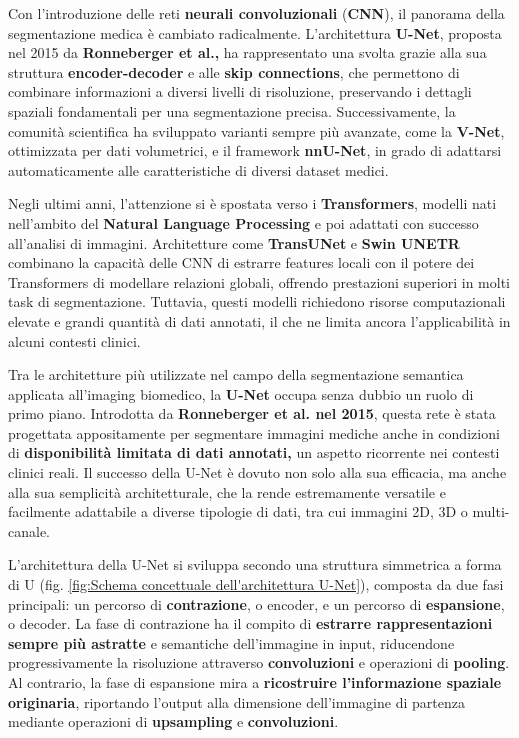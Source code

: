 Con l’introduzione delle reti \textbf{neurali convoluzionali} (\textbf{CNN}), il panorama della segmentazione medica è cambiato radicalmente. L’architettura \textbf{U-Net}, proposta nel 2015 da \textbf{Ronneberger et al.,} ha rappresentato una svolta grazie alla sua struttura \textbf{encoder-decoder} e alle \textbf{skip connections}, che permettono di combinare informazioni a diversi livelli di risoluzione, preservando i dettagli spaziali fondamentali per una segmentazione precisa. Successivamente, la comunità scientifica ha sviluppato varianti sempre più avanzate, come la \textbf{V-Net}, ottimizzata per dati volumetrici, e il framework \textbf{nnU-Net}, in grado di adattarsi automaticamente alle caratteristiche di diversi dataset medici.

Negli ultimi anni, l’attenzione si è spostata verso i \textbf{Transformers}, modelli nati nell’ambito del \textbf{Natural Language Processing} e poi adattati con successo all’analisi di immagini. Architetture come \textbf{TransUNet} e \textbf{Swin UNETR} combinano la capacità delle CNN di estrarre features locali con il potere dei Transformers di modellare relazioni globali, offrendo prestazioni superiori in molti task di segmentazione. Tuttavia, questi modelli richiedono risorse computazionali elevate e grandi quantità di dati annotati, il che ne limita ancora l’applicabilità in alcuni contesti clinici.



Tra le architetture più utilizzate nel campo della segmentazione semantica applicata all’imaging biomedico, la \textbf{U-Net} occupa senza dubbio un ruolo di primo piano. Introdotta da \textbf{Ronneberger et al. nel 2015}, questa rete è stata progettata appositamente per segmentare immagini mediche anche in condizioni di \textbf{disponibilità limitata di dati annotati,} un aspetto ricorrente nei contesti clinici reali. Il successo della U-Net è dovuto non solo alla sua efficacia, ma anche alla sua semplicità architetturale, che la rende estremamente versatile e facilmente adattabile a diverse tipologie di dati, tra cui immagini 2D, 3D o multi-canale.

L'architettura della U-Net si sviluppa secondo una struttura simmetrica a forma di U (fig. \ref{fig:Schema concettuale dell'architettura U-Net}), composta da due fasi principali: un percorso di \textbf{contrazione}, o encoder, e un percorso di \textbf{espansione}, o decoder. La fase di contrazione ha il compito di \textbf{estrarre rappresentazioni sempre più astratte} e semantiche dell’immagine in input, riducendone progressivamente la risoluzione attraverso \textbf{convoluzioni} e operazioni di \textbf{pooling}. Al contrario, la fase di espansione mira a \textbf{ricostruire l’informazione spaziale originaria}, riportando l’output alla dimensione dell’immagine di partenza mediante operazioni di \textbf{upsampling} e \textbf{convoluzioni}.

